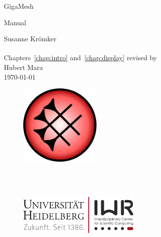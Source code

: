 \begin{titlepage}


\thispagestyle{empty} \noindent \vspace{15mm} 
\begin{center}{\huge\sc GigaMesh}\end{center} \noindent 
\begin{center}{\LARGE{Manual}}\end{center} \noindent 
\begin{center}
{\footnotesize\sc 
	Susanne Kr\"omker \\
	 \\
	\vspace{7mm} 
	Chapters~\ref{chap:intro} and~\ref{chap:display} revised by \\
	\vspace{3mm} 
	Hubert Mara \\
	\today
}
\end{center} \vspace{20mm} 

\begin{figure}[H]
    \centering
    \includegraphics[width=4cm]{logos/GigaMesh_Logo}
\end{figure}

\noindent \\ \noindent \\ \noindent 
\begin{center}{\iwraddress}\end{center}
\begin{figure}[H]
    \centering
    \includegraphics[width=6cm]{logos/UniHD+IWR-Logo} 
\end{figure}

\end{titlepage}